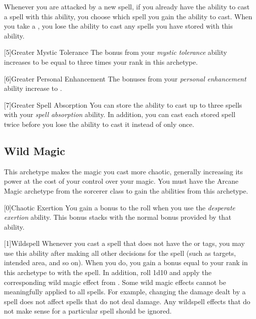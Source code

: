         Whenever you are attacked by a new spell, if you already have the ability to cast a spell with this ability, you choose which spell you gain the ability to cast.
        When you take a , you lose the ability to cast any spells you have stored with this ability.

        [5]{Greater Mystic Tolerance} The bonus from your \textit{mystic tolerance} ability increases to be equal to three times your rank in this archetype.

        [6]{Greater Personal Enhancement} The bonuses from your \textit{personal enhancement} ability increase to .

        [7]{Greater Spell Absorption} You can store the ability to cast up to three spells with your \textit{spell absorption} ability.
        In addition, you can cast each stored spell twice before you lose the ability to cast it instead of only once.

    \newpage
    \subsection{Wild Magic}
        This archetype makes the magic you cast more chaotic, generally increasing its power at the cost of your control over your magic.
        You must have the Arcane Magic archetype from the sorcerer class to gain the abilities from this archetype.

        [0]{Chaotic Exertion} You gain a  bonus to the roll when you use the \textit{desperate exertion} ability.
        This bonus stacks with the normal  bonus provided by that ability.

        [1]{Wildspell} Whenever you cast a spell that does not have the  or  tags, you may use this ability after making all other decisions for the spell (such as targets, intended area, and so on).
        When you do, you gain a bonus equal to your rank in this archetype to  with the spell.
        In addition, roll 1d10 and apply the corresponding wild magic effect from .
        Some wild magic effects cannot be meaningfully applied to all spells.
        For example, changing the damage dealt by a spell does not affect spells that do not deal damage.
        Any wildspell effects that do not make sense for a particular spell should be ignored.

